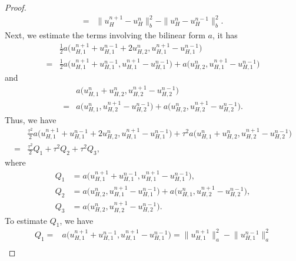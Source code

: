 \documentclass[preprint,12pt]{elsarticle}
\begin{document}
\begin{proof}
\begin{equation}
\begin{aligned}
    =&\|u_H^{n+1}-u_H^n\|_b^2-\|u_H^{n}-u_H^{n-1}\|_b^2.
\end{aligned}
\end{equation}
Next, we estimate the terms involving the bilinear form $a$, it has
\begin{equation}\label{1.116}
\begin{aligned}
     &\frac{1}{2} a\big(u_{H,1}^{n+1}+u_{H,1}^{n-1}+2u_{H,2}^{n},u_{H,1}^{n+1}-u_{H,1}^{n-1}\big)\\
     =& \frac{1}{2}a\big(u_{H,1}^{n+1}+u_{H,1}^{n-1},u_{H,1}^{n+1}-u_{H,1}^{n-1}\big)+a\big(u_{H,2}^{n},u_{H,1}^{n+1}-u_{H,1}^{n-1}\big)
\end{aligned}
\end{equation}
and
\begin{equation}\label{1.117}
\begin{aligned}
      &a\big (u_{H,1}^{n}+u_{H,2}^{n},u_{H,2}^{n+1}-u_{H,2}^{n-1}\big)\\
      =&a\big(u_{H,1}^{n},u_{H,2}^{n+1}-u_{H,2}^{n-1}\big)+a\big(u_{H,2}^{n},u_{H,2}^{n+1}-u_{H,2}^{n-1}\big).
\end{aligned}
\end{equation}
Thus, we have 
\begin{equation}\label{1.118}
\begin{aligned}
      &\frac{\tau^2}{2}a\big(u_{H,1}^{n+1}+u_{H,1}^{n-1}+2u_{H,2}^{n},u_{H,1}^{n+1}-u_{H,1}^{n-1}\big)+\tau^2 a\big(u_{H,1}^{n}+u_{H,2}^{n},u_{H,2}^{n+1}-u_{H,2}^{n-1}\big)\\
      =&\frac{\tau^2}{2}Q_1+\tau^2Q_2+\tau^2Q_3,
\end{aligned}
\end{equation}
where
\begin{equation}\label{1.119}
\begin{aligned}
      Q_1&=a\big(u_{H,1}^{n+1}+u_{H,1}^{n-1},u_{H,1}^{n+1}-u_{H,1}^{n-1}\big),\\
      Q_2&=a\big(u_{H,2}^{n},u_{H,1}^{n+1}-u_{H,1}^{n-1})+a\big(u_{H,1}^{n},u_{H,2}^{n+1}-u_{H,2}^{n-1}\big),\\
      Q_3&=a\big(u_{H,2}^{n},u_{H,2}^{n+1}-u_{H,2}^{n-1}\big).
\end{aligned}
\end{equation}
To estimate $Q_1$, we have
\begin{equation}\label{1.120}
\begin{aligned}
      Q_1=&a\big(u_{H,1}^{n+1}+u_{H,1}^{n-1},u_{H,1}^{n+1}-u_{H,1}^{n-1}\big)=\big\|u_{H,1}^{n+1}\big\|_a^2-\big\|u_{H,1}^{n-1}\big\|_a^2\\

\end{aligned}
\end{equation}
\end{proof}
\end{document}

